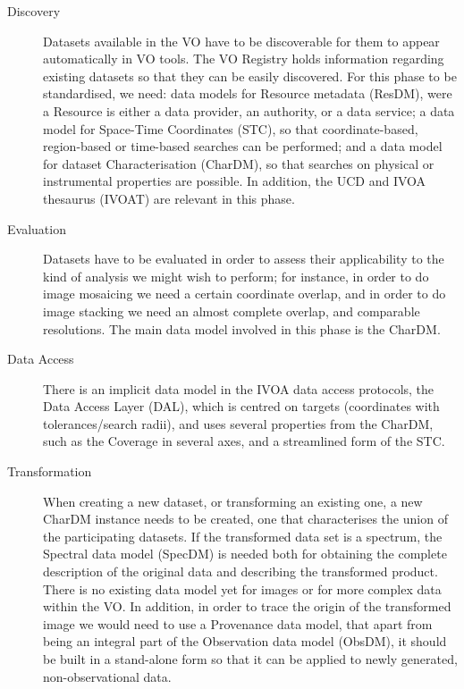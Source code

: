 		\begin{description}
			\item[Discovery] Datasets available in the VO have to
			be discoverable for them to appear automatically in VO
			tools. The VO Registry holds information regarding
			existing datasets so that they can be easily
			discovered. For this phase to be standardised, we need:
			data models for Resource metadata (ResDM), were a
			Resource is either a data provider, an authority, or a
			data service; a data model for Space-Time Coordinates
			(STC), so that coordinate-based, region-based or
			time-based searches can be performed; and a data model
			for dataset Characterisation (CharDM), so that searches
			on physical or instrumental properties are possible. In
			addition, the UCD and IVOA thesaurus (IVOAT) are
			relevant in this phase.
			
			\item[Evaluation] Datasets have to be evaluated in
			order to assess their applicability to the kind of
			analysis we might wish to perform; for instance, in
			order to do image mosaicing we need a certain
			coordinate overlap, and in order to do image stacking
			we need an almost complete overlap, and comparable
			resolutions. The main data model involved in this phase
			is the CharDM.
			
			\item[Data Access] There is an implicit data model in
			the IVOA data access protocols, the Data Access Layer
			(DAL), which is centred on targets (coordinates with
			tolerances/search radii), and uses several properties
			from the CharDM, such as the Coverage in several axes,
			and a streamlined form of the STC.
			
			\item[Transformation] When creating a new dataset, or
			transforming an existing one, a new CharDM instance
			needs to be created, one that characterises the
			union of the participating datasets. If the
			transformed data set is a spectrum, the Spectral data
			model (SpecDM) is needed both for obtaining the
			complete description of the original data and
			describing the transformed product. There is no
			existing data model yet for images or for more complex
			data within the VO. In addition, in order to trace the
			origin of the transformed image we would need to use a
			Provenance data model, that apart from being an
			integral part of the Observation data model (ObsDM), it
			should be built in a stand-alone form so that it can be
			applied to newly generated, non-observational data.
		\end{description}
	
